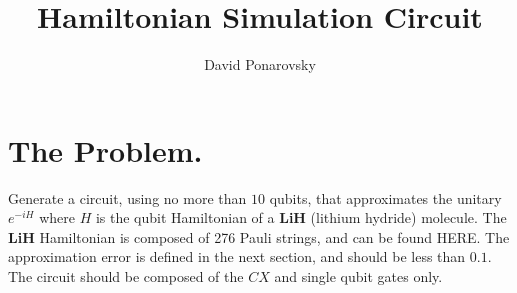 \documentclass{article}
\begin{document}
\newcommand{\commentt}[1]{\textcolor{blue}{ \textbf{[COMMENT]} #1}}
\newcommand{\ctt}[1]{\commentt{#1}}
\newcommand{\prb}[1]{ \mathbf{Pr} \left[ {#1} \right]}
\newcommand{\expp}[1]{ \mathbf{E} \left[ {#1} \right]}
\newcommand{\onotation}[1]{\(\mathcal{O} \left( {#1}  \right) \)}
\newcommand{\ona}[1]{\onotation{#1}}
\newcommand{\PSI}{{\ket{\psi}}}
\newcommand{\LESn}{\ket{\psi_n}}
\newcommand{\LESa}{\ket{\phi_n}}
\newcommand{\LESs}{\frac{1}{\sqrt{n}}\sum_{i}{\ket{\left(0^{i}10^{n-i}\right)^{n}}}}
\newcommand{\Hn}{\mathcal{H}_{n}}

\newcommand{\Ep}{\frac{1}{\sqrt{2^n}}\sum^{2^n}_{x}{ \ket{xx}}}
\newcommand{\HON}{\ket{\psi_{\text{honest}}}}



\title{Hamiltonian Simulation Circuit}
\author{David Ponarovsky}
\maketitle
{}


\section{The Problem.}
Generate a circuit, using no more than \(10\) qubits, that approximates the unitary \(e^{-iH}\) where \(H\) is the qubit Hamiltonian of a \textbf{LiH} (lithium hydride) molecule. The \textbf{LiH} Hamiltonian is composed of 276 Pauli strings, and can be found HERE. The approximation error is defined in the next section, and should be less than \(0.1\). The circuit should be composed of the \(CX\) and single qubit gates only.
\end{document}

